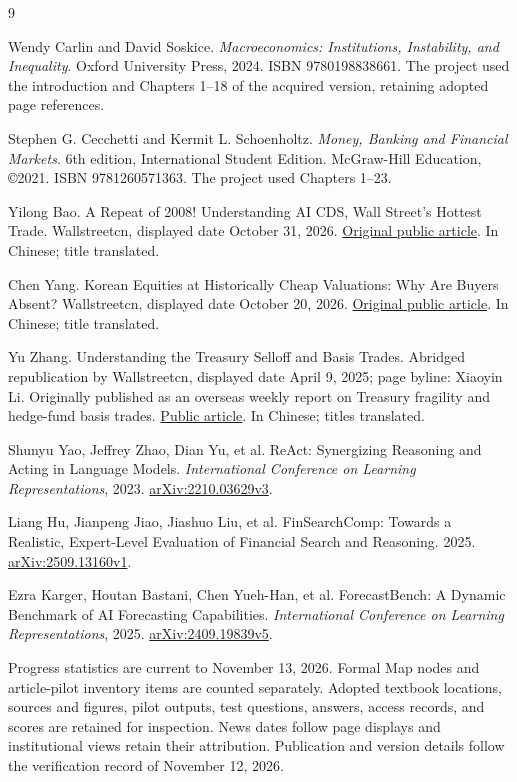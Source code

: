 \documentclass[11pt,letterpaper]{article}
\begin{document}
\newpage
\begin{thebibliography}{9}
\small
\setlength{\itemsep}{7pt}
\setlength{\parskip}{0pt}

Wendy Carlin and David Soskice.
\textit{Macroeconomics: Institutions, Instability, and Inequality}.
Oxford University Press, 2024. ISBN 9780198838661.
The project used the introduction and Chapters 1--18 of the acquired version, retaining adopted page references.

Stephen G. Cecchetti and Kermit L. Schoenholtz.
\textit{Money, Banking and Financial Markets}.
6th edition, International Student Edition. McGraw-Hill Education, \copyright{}2021.
ISBN 9781260571363. The project used Chapters 1--23.

Yilong Bao.
A Repeat of 2008! Understanding AI CDS, Wall Street's Hottest Trade.
Wallstreetcn, displayed date October 31, 2026.
\href{https://wallstreetcn.com/articles/3784900}{Original public article}.
In Chinese; title translated.

Chen Yang.
Korean Equities at Historically Cheap Valuations: Why Are Buyers Absent?
Wallstreetcn, displayed date October 20, 2026.
\href{https://wallstreetcn.com/articles/3784053}{Original public article}.
In Chinese; title translated.

Yu Zhang.
Understanding the Treasury Selloff and Basis Trades.
Abridged republication by Wallstreetcn, displayed date April 9, 2025; page byline: Xiaoyin Li.
Originally published as an overseas weekly report on Treasury fragility and hedge-fund basis trades.
\href{https://wallstreetcn.com/articles/3744871}{Public article}.
In Chinese; titles translated.

Shunyu Yao, Jeffrey Zhao, Dian Yu, et al.
ReAct: Synergizing Reasoning and Acting in Language Models.
\textit{International Conference on Learning Representations}, 2023.
\href{https://arxiv.org/abs/2210.03629v3}{arXiv:2210.03629v3}.

Liang Hu, Jianpeng Jiao, Jiashuo Liu, et al.
FinSearchComp: Towards a Realistic, Expert-Level Evaluation of Financial Search and Reasoning.
2025. \href{https://arxiv.org/abs/2509.13160v1}{arXiv:2509.13160v1}.

Ezra Karger, Houtan Bastani, Chen Yueh-Han, et al.
ForecastBench: A Dynamic Benchmark of AI Forecasting Capabilities.
\textit{International Conference on Learning Representations}, 2025.
\href{https://arxiv.org/abs/2409.19839v5}{arXiv:2409.19839v5}.

\end{thebibliography}


\vspace{8pt}
{\small
{}
Progress statistics are current to November 13, 2026. Formal Map nodes and article-pilot inventory items are counted separately. Adopted textbook locations, sources and figures, pilot outputs, test questions, answers, access records, and scores are retained for inspection. News dates follow page displays and institutional views retain their attribution. Publication and version details follow the verification record of November 12, 2026.
}
\end{document}
